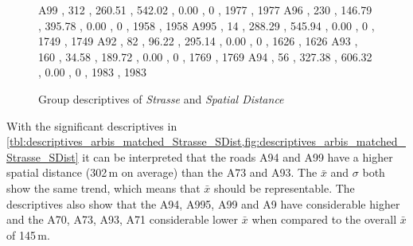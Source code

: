 \begin{figure}[ht!]
\begin{minipage}{0.55\textwidth}
{			A99  , 312  , 260.51 , 542.02 , 0.00 , 0 , 1977 , 1977 
			A96  , 230  , 146.79 , 395.78 , 0.00 , 0 , 1958 , 1958 
			A995 , 14   , 288.29 , 545.94 , 0.00 , 0 , 1749 , 1749 
			A92  , 82   , 96.22  , 295.14 , 0.00 , 0 , 1626 , 1626 
			A93  , 160  , 34.58  , 189.72 , 0.00 , 0 , 1769 , 1769 
			A94  , 56   , 327.38 , 606.32 , 0.00 , 0 , 1983 , 1983  
		}\data
		\pgfplotstablesort[sort key=mean, sort cmp=float >]{\datasorted}{\data}
		\tiny
		\centering
		\label{fig:descriptives_arbis_matched_Strasse_SDist}
	\end{minipage}%
	\caption{Group descriptives of \textit{Strasse} and \textit{Spatial Distance}}
\end{figure}
With the significant descriptives in \cref{tbl:descriptives_arbis_matched_Strasse_SDist,fig:descriptives_arbis_matched_Strasse_SDist} it can be interpreted that the roads A94 and A99 have a higher spatial distance (302\,m on average) than the A73 and A93. The $\bar{x}$ and $\sigma$ both show the same trend, which means that $\bar{x}$ should be representable. The descriptives also show that the A94, A995, A99 and A9 have considerable higher and the A70, A73, A93, A71 considerable lower $\bar{x}$ when compared to the overall $\bar{x}$ of 145\,m.

